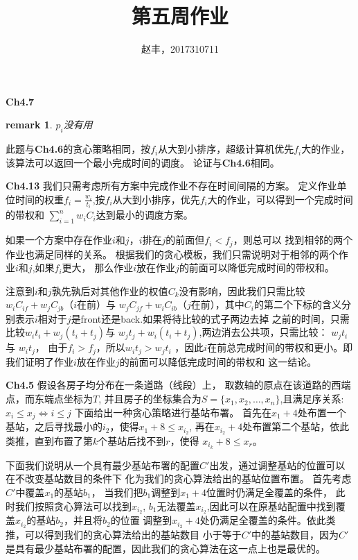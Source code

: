 \documentclass{article}
\newtheorem{remark}{remark}
\begin{document}
\title{第五周作业}
\author{赵丰，2017310711}
\maketitle

\textbf{Ch4.7}

\begin{remark}
$p_i$没有用
\end{remark}
此题与\textbf{Ch4.6}的贪心策略相同，按$f_i$从大到小排序，超级计算机优先$f_i$大的作业，该算法可以返回一个最小完成时间的调度。
论证与\textbf{Ch4.6}相同。

\textbf{Ch4.13}
我们只需考虑所有方案中完成作业不存在时间间隔的方案。
定义作业单位时间的权重$f_i=\frac{w_i}{t_i}$,按$f_i$从大到小排序，优先$f_i$大的作业，可以得到一个完成时间的带权和
$\displaystyle\sum_{i=1}^n w_i C_i$达到最小的调度方案。

如果一个方案中存在作业$i$和$j$，$i$排在$j$的前面但$f_i<f_j$，则总可以
找到相邻的两个作业也满足同样的关系。
根据我们的贪心模板，我们只需说明对于相邻的两个作业$i$和$j$,如果$f_i$更大，
那么作业$i$放在作业$j$的前面可以降低完成时间的带权和。

注意到$i$和$j$孰先孰后对其他作业的权值$C_k$没有影响，因此我们只需比较$w_i C_{if}+w_j C_{jb}$（$i$在前）与
$w_j C_{jf}+w_i C_{ib}$（$j$在前），其中$C_i$的第二个下标的含义分别表示$i$相对于$j$是front还是back.如果将待比较的式子两边去掉
之前的时间，只需比较$w_i t_i+w_j (t_i+t_j)$与 $w_j t_j+w_i (t_i+t_j)$,两边消去公共项，只需比较：
$w_j t_i$与 $w_i t_j$，
由于$f_i>f_j$，所以$w_i t_j > w_j t_i$ ，因此$i$在前总完成时间的带权和更小。即我们证明了作业$i$放在作业$j$的前面可以降低完成时间的带权和
这一结论。

\textbf{Ch4.5}
假设各房子均分布在一条道路（线段）上，
取数轴的原点在该道路的西端点，而东端点坐标为$T$,
并且房子的坐标集合为$S=\{x_1,x_2,\dots,x_n\}$,且满足序关系:
$x_i\leq x_j \iff i\leq j$
下面给出一种贪心策略进行基站布署。
首先在$x_1+4$处布置一个基站，之后寻找最小的$i_2$，使得$x_1+8\leq x_{i_2}$,
再在$x_{i_2}+4$处布置第二个基站，依此类推，直到布置了第$k$个基站后找不到$r$，使得
$x_{i_k}+8\leq x_r$。

下面我们说明从一个具有最少基站布署的配置$C'$出发，通过调整基站的位置可以在不改变基站数目的条件下
化为我们的贪心算法给出的基站位置布置。
首先考虑 $C'$中覆盖$x_1$的基站$b_1$，
当我们把$b_1$调整到$x_1+4$位置时仍满足全覆盖的条件，
此时我们按照贪心算法可以找到$x_{i_2}$,
$b_1$无法覆盖$x_{i_2}$,因此可以在原基站配置中找到覆盖$x_{i_2}$的基站$b_2$，并且将$b_2$的位置
调整到$x_{i_2}+4$处仍满足全覆盖的条件。依此类推，可以得到我们的贪心算法给出的基站数目
小于等于$C'$中的基站数目，因为$C'$是具有最少基站布署的配置，因此我们的贪心算法在这一点上也是最优的。
\end{document}
